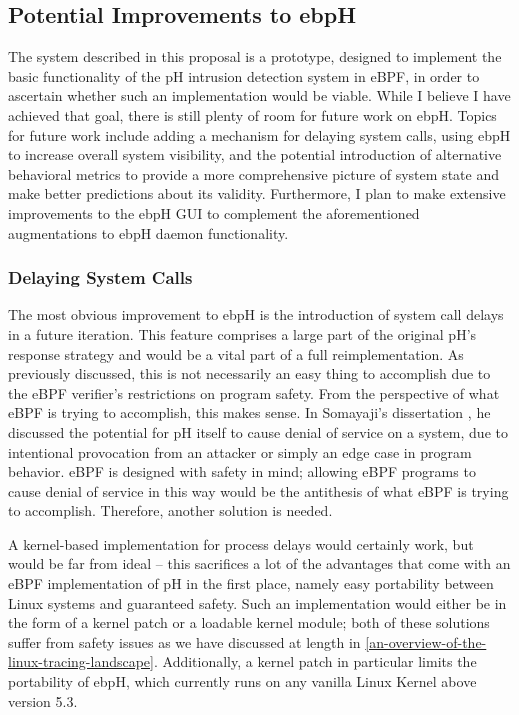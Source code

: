 \documentclass[
  12pt]{findlay}
\begin{document}
\hypertarget{potential-improvements-to-ebph}{%
\subsection{Potential Improvements to
ebpH}\label{potential-improvements-to-ebph}}

The system described in this proposal is a prototype, designed to
implement the basic functionality of the pH intrusion detection system
in eBPF, in order to ascertain whether such an implementation would be
viable. While I believe I have achieved that goal, there is still plenty
of room for future work on ebpH. Topics for future work include adding a
mechanism for delaying system calls, using ebpH to increase overall
system visibility, and the potential introduction of alternative
behavioral metrics to provide a more comprehensive picture of system
state and make better predictions about its validity. Furthermore, I
plan to make extensive improvements to the ebpH GUI to complement the
aforementioned augmentations to ebpH daemon functionality.

\hypertarget{delaying-system-calls}{%
\subsubsection{Delaying System Calls}\label{delaying-system-calls}}

The most obvious improvement to ebpH is the introduction of system call
delays in a future iteration. This feature comprises a large part of the
original pH's response strategy and would be a vital part of a full
reimplementation. As previously discussed, this is not necessarily an
easy thing to accomplish due to the eBPF verifier's restrictions on
program safety. From the perspective of what eBPF is trying to
accomplish, this makes sense. In Somayaji's dissertation
\autocite{soma02}, he discussed the potential for pH itself to cause
denial of service on a system, due to intentional provocation from an
attacker or simply an edge case in program behavior. eBPF is designed
with safety in mind; allowing eBPF programs to cause denial of service
in this way would be the antithesis of what eBPF is trying to
accomplish. Therefore, another solution is needed.

A kernel-based implementation for process delays would certainly work,
but would be far from ideal -- this sacrifices a lot of the advantages
that come with an eBPF implementation of pH in the first place, namely
easy portability between Linux systems and guaranteed safety. Such an
implementation would either be in the form of a kernel patch or a
loadable kernel module; both of these solutions suffer from safety
issues as we have discussed at length in
\autoref{an-overview-of-the-linux-tracing-landscape}. Additionally, a
kernel patch in particular limits the portability of ebpH, which
currently runs on any vanilla Linux Kernel above version 5.3.
\end{document}
